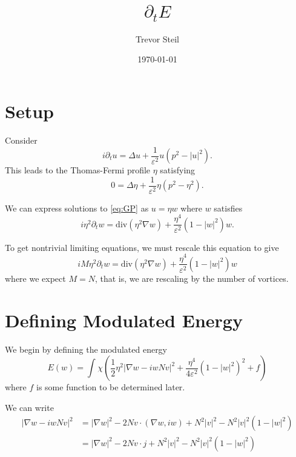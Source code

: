 \documentclass[a4paper]{article}
\title{$\partial_t E$ }
\date{\today}
\author{Trevor Steil}
\renewcommand{\div}{\mathrm{div}}
\newlength{\horizspace}
\newlength{\smallspace}
\begin{document}
\maketitle

\setlength{\horizspace}{1.5cm}
\setlength{\smallspace}{.7cm}


\section{Setup}
Consider
\begin{equation} \label{eq:GP}
  i \partial_t u = \Delta u + \frac{1}{\varepsilon^2} u (p^2 - |u|^2).
\end{equation}
This leads to the Thomas-Fermi profile $\eta$ satisfying
\begin{equation} \label{eq:Thomas-Fermi}
  0 = \Delta \eta + \frac{1}{\varepsilon^2} \eta (p^2 - \eta^2).
\end{equation}

We can express solutions to \eqref{eq:GP} as $u = \eta w$ where $w$ satisfies
\begin{equation} \label{eq:PDE}
  i \eta^2 \partial_t w = \div ( \eta^2 \nabla w ) + \frac{\eta^4}{\varepsilon^2} ( 1 - |w|^2 ) w.
\end{equation}

To get nontrivial limiting equations, we must rescale this equation to give
\begin{equation}
  i M \eta^2 \partial_t w = \div ( \eta^2 \nabla w ) + \frac{\eta^4}{\varepsilon^2}(1 - |w|^2)w
  \label{eq:rescaled_PDE}
\end{equation}
where we expect $M = N$, that is, we are rescaling by the number of vortices.

\section{Defining Modulated Energy}

We begin by defining the modulated energy
\begin{equation}
  E(w) = \int_{}^{} \chi ( \frac{1}{2} \eta^2 | \nabla w - i w N v|^2 + \frac{\eta^4}{4 \varepsilon^2} (1 - |w|^2)^2 + f )
  \label{eq:modulated_energy1}
\end{equation}
where $f$ is some function to be determined later.

We can write
\begin{align*}
  | \nabla w - i w N v |^2 &= |\nabla w|^2 - 2 N v \cdot ( \nabla w, iw ) + N^2 |v|^2 - N^2 |v|^2 (1-|w|^2) \\
  &= | \nabla w |^2 - 2N v \cdot j + N^2 |v|^2 - N^2 |v|^2 ( 1 -|w|^2 )
\end{align*}
\end{document}

